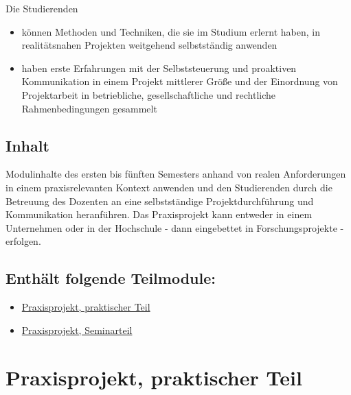 Die Studierenden

\begin{itemize}
\tightlist
\item
  können Methoden und Techniken, die sie im Studium erlernt haben, in
  realitätsnahen Projekten weitgehend selbstständig anwenden
\item
  haben erste Erfahrungen mit der Selbststeuerung und proaktiven
  Kommunikation in einem Projekt mittlerer Größe und der Einordnung von
  Projektarbeit in betriebliche, gesellschaftliche und rechtliche
  Rahmenbedingungen gesammelt
\end{itemize}

\hypertarget{inhaltpathlabelmi-2017modulbeschreibungen-bachelorba_praxisprojekt}{%
\section*{Inhalt\label{/mi-2017/modulbeschreibungen-bachelor/BA_Praxisprojekt}}\label{inhaltpathlabelmi-2017modulbeschreibungen-bachelorba_praxisprojekt}}

Modulinhalte des ersten bis fünften Semesters anhand von realen
Anforderungen in einem praxisrelevanten Kontext anwenden und den
Studierenden durch die Betreuung des Dozenten an eine selbstständige
Projektdurchführung und Kommunikation heranführen. Das Praxisprojekt
kann entweder in einem Unternehmen oder in der Hochschule - dann
eingebettet in Forschungsprojekte - erfolgen.

\hypertarget{enthuxe4lt-folgende-teilmodulepathlabelmi-2017modulbeschreibungen-bachelorba_praxisprojekt}{%
\section*{Enthält folgende
Teilmodule:\label{/mi-2017/modulbeschreibungen-bachelor/BA_Praxisprojekt}}\label{enthuxe4lt-folgende-teilmodulepathlabelmi-2017modulbeschreibungen-bachelorba_praxisprojekt}}

\begin{itemize}
\tightlist
\item
  \hyperref[/mi-2017/modulbeschreibungen-bachelor/BA_Praxisprojektarbeit]{Praxisprojekt, praktischer Teil}
\item
  \hyperref[/mi-2017/modulbeschreibungen-bachelor/BA_Praxisprojektseminar]{Praxisprojekt, Seminarteil}
\end{itemize}

\hypertarget{praxisprojekt-praktischer-teilpathlabelmi-2017modulbeschreibungen-bachelorba_praxisprojektarbeit}{%
\chapter{Praxisprojekt, praktischer
Teil\label{/mi-2017/modulbeschreibungen-bachelor/BA_Praxisprojektarbeit}}\label{praxisprojekt-praktischer-teilpathlabelmi-2017modulbeschreibungen-bachelorba_praxisprojektarbeit}}

